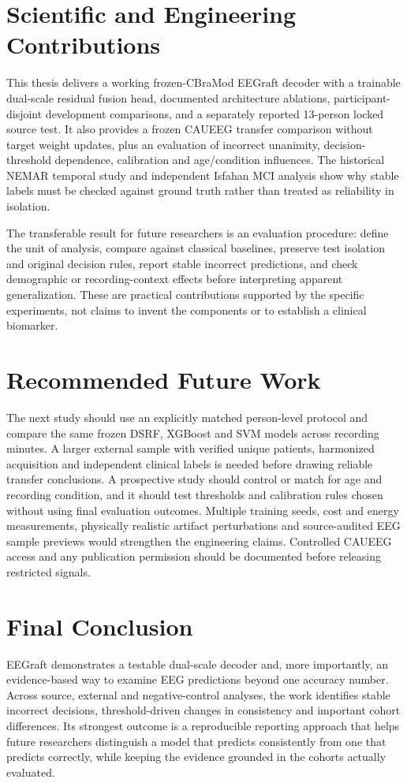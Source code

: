 \section{Scientific and Engineering Contributions}
This thesis delivers a working frozen-CBraMod EEGraft decoder with a trainable dual-scale residual fusion head, documented architecture ablations, participant-disjoint development comparisons, and a separately reported 13-person locked source test. It also provides a frozen CAUEEG transfer comparison without target weight updates, plus an evaluation of incorrect unanimity, decision-threshold dependence, calibration and age/condition influences. The historical NEMAR temporal study and independent Isfahan MCI analysis show why stable labels must be checked against ground truth rather than treated as reliability in isolation.

The transferable result for future researchers is an evaluation procedure: define the unit of analysis, compare against classical baselines, preserve test isolation and original decision rules, report stable incorrect predictions, and check demographic or recording-context effects before interpreting apparent generalization. These are practical contributions supported by the specific experiments, not claims to invent the components or to establish a clinical biomarker.

\section{Recommended Future Work}
The next study should use an explicitly matched person-level protocol and compare the same frozen DSRF, XGBoost and SVM models across recording minutes. A larger external sample with verified unique patients, harmonized acquisition and independent clinical labels is needed before drawing reliable transfer conclusions. A prospective study should control or match for age and recording condition, and it should test thresholds and calibration rules chosen without using final evaluation outcomes. Multiple training seeds, cost and energy measurements, physically realistic artifact perturbations and source-audited EEG sample previews would strengthen the engineering claims. Controlled CAUEEG access and any publication permission should be documented before releasing restricted signals.

\section{Final Conclusion}
EEGraft demonstrates a testable dual-scale decoder and, more importantly, an evidence-based way to examine EEG predictions beyond one accuracy number. Across source, external and negative-control analyses, the work identifies stable incorrect decisions, threshold-driven changes in consistency and important cohort differences. Its strongest outcome is a reproducible reporting approach that helps future researchers distinguish a model that predicts consistently from one that predicts correctly, while keeping the evidence grounded in the cohorts actually evaluated.
